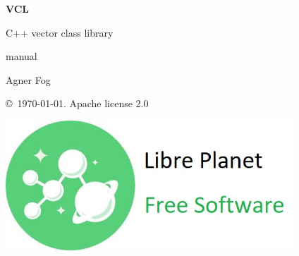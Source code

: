 \documentclass[11pt,a4paper,oneside,openright]{report}
\newcommand{\indenton}{\RaggedRight\parindent=15pt}
\newcommand{\vspacesmall}{\vspace{3mm}}
\newcommand{\vspacebig}{\vspace{6mm}}
\begin{document}
\begin{titlepage}
    \centering
   
    \null %
    \vfill

   {\bfseries\Huge
    VCL 
    \vspacesmall
        
    C++ vector class library 
    \vspacebig
        
    manual
   }        
    \vspacebig
    
   {\Large    
    Agner Fog
    \vspacebig
    
    \copyright\ \today. Apache license 2.0
   }
    
    \vfill
    
    \includegraphics[width=306pt]{freesoftwarelogo.jpg}
    \vfill
    
\end{titlepage}

\RaggedRight



\tableofcontents
\setcounter{secnumdepth}{1}
\flushleft


























\end{document}
